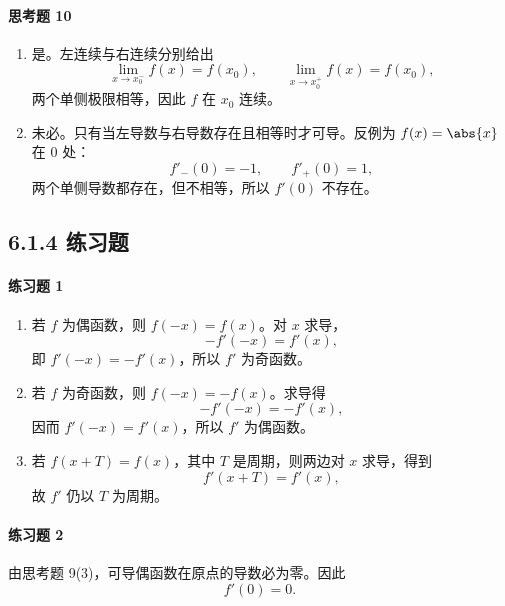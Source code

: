\paragraph{思考题 10}
\begin{xsolution}
\begin{enumerate}[label=(\arabic*)]
  \item 是。左连续与右连续分别给出
  \[
    \lim_{x\to x_0^-}f(x)=f(x_0),
    \qquad
    \lim_{x\to x_0^+}f(x)=f(x_0),
  \]
  两个单侧极限相等，因此 $f$ 在 $x_0$ 连续。

  \item 未必。只有当左导数与右导数存在且相等时才可导。反例为 $f(x)=\abs{x}$ 在 $0$ 处：
  \[
    f'_-(0)=-1,\qquad f'_+(0)=1,
  \]
  两个单侧导数都存在，但不相等，所以 $f'(0)$ 不存在。
\end{enumerate}
\end{xsolution}

\subsection*{6.1.4 练习题}

\paragraph{练习题 1}
\begin{xsolution}
\begin{enumerate}[label=(\arabic*)]
  \item 若 $f$ 为偶函数，则 $f(-x)=f(x)$。对 $x$ 求导，
  \[
    -f'(-x)=f'(x),
  \]
  即 $f'(-x)=-f'(x)$，所以 $f'$ 为奇函数。

  \item 若 $f$ 为奇函数，则 $f(-x)=-f(x)$。求导得
  \[
    -f'(-x)=-f'(x),
  \]
  因而 $f'(-x)=f'(x)$，所以 $f'$ 为偶函数。

  \item 若 $f(x+T)=f(x)$，其中 $T$ 是周期，则两边对 $x$ 求导，得到
  \[
    f'(x+T)=f'(x),
  \]
  故 $f'$ 仍以 $T$ 为周期。
\end{enumerate}
\end{xsolution}

\paragraph{练习题 2}
\begin{xsolution}
由思考题 9(3)，可导偶函数在原点的导数必为零。因此
\[
  f'(0)=0.
\]
\end{xsolution}

